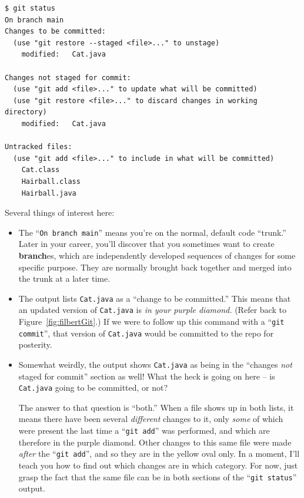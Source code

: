\begin{Verbatim}[fontsize=\scriptsize,samepage=true,frame=single]
$ git status
On branch main
Changes to be committed:
  (use "git restore --staged <file>..." to unstage)
    modified:   Cat.java

Changes not staged for commit:
  (use "git add <file>..." to update what will be committed)
  (use "git restore <file>..." to discard changes in working directory)
    modified:   Cat.java

Untracked files:
  (use "git add <file>..." to include in what will be committed)
    Cat.class
    Hairball.class
    Hairball.java
\end{Verbatim}

Several things of interest here:

\begin{itemize}

\item The ``\texttt{On branch main}'' means you're on the normal, default code
``trunk.'' Later in your career, you'll discover that you sometimes want to
create \textbf{branch}es, which are independently developed sequences of
changes for some specific purpose. They are normally brought back together and
merged into the trunk at a later time.

\item The output lists \texttt{Cat.java} as a ``change to be committed.'' This
means that an updated version of \texttt{Cat.java} is \textit{in your purple
diamond.} (Refer back to Figure~\ref{fig:filbertGit}.) If we were to follow up
this command with a ``\texttt{git commit}'', that version of \texttt{Cat.java}
would be committed to the repo for posterity.

\item Somewhat weirdly, the output shows \texttt{Cat.java} as being in the
``changes \textit{not} staged for commit'' section as well! What the heck is
going on here -- is \texttt{Cat.java} going to be committed, or not?

The answer to that question is ``both.'' When a file shows up in both lists,
it means there have been several \textit{different} changes to it, only
\textit{some} of which were present the last time a ``\texttt{git add}'' was
performed, and which are therefore in the purple diamond. Other changes to this
same file were made \textit{after} the ``\texttt{git add}'', and so they are
in the yellow oval only. In a moment, I'll teach you how to find out which
changes are in which category. For now, just grasp the fact that the same file
can be in both sections of the ``\texttt{git status}'' output.


\end{itemize}
